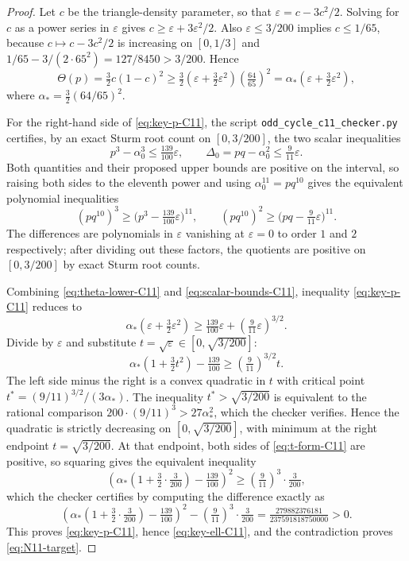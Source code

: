 \documentclass[11pt]{article}
\newcommand{\eps}{\varepsilon}
\begin{document}
\begin{proof}
Let $c$ be the triangle-density parameter, so that $\eps=c-3c^2/2$.  Solving for $c$ as a power series in $\eps$ gives $c\ge\eps+3\eps^2/2$.  Also $\eps\le3/200$ implies $c\le1/65$, because $c\mapsto c-3c^2/2$ is increasing on $[0,1/3]$ and $1/65-3/(2\cdot65^2)=127/8450>3/200$.  Hence
\begin{equation}\label{eq:theta-lower-C11}
        \Theta(p)=\tfrac32 c(1-c)^2
        \ge \tfrac32\left(\eps+\tfrac32\eps^2\right)\left(\tfrac{64}{65}\right)^2
        =\alpha_*\left(\eps+\tfrac32\eps^2\right),
\end{equation}
where $\alpha_*=\tfrac32(64/65)^2$.

For the right-hand side of \eqref{eq:key-p-C11}, the script \texttt{odd\_cycle\_c11\_checker.py} certifies, by an exact Sturm root count on $[0,3/200]$, the two scalar inequalities
\begin{equation}\label{eq:scalar-bounds-C11}
        p^3-\alpha_0^3\le \tfrac{139}{100}\eps,
        \qquad
        \Delta_0=pq-\alpha_0^2\le \tfrac{9}{11}\eps.
\end{equation}
Both quantities and their proposed upper bounds are positive on the interval, so raising both sides to the eleventh power and using $\alpha_0^{11}=pq^{10}$ gives the equivalent polynomial inequalities
\[
        (pq^{10})^3\ge\bigl(p^3-\tfrac{139}{100}\eps\bigr)^{11},
        \qquad
        (pq^{10})^2\ge\bigl(pq-\tfrac{9}{11}\eps\bigr)^{11}.
\]
The differences are polynomials in $\eps$ vanishing at $\eps=0$ to order $1$ and $2$ respectively; after dividing out these factors, the quotients are positive on $[0,3/200]$ by exact Sturm root counts.

Combining \eqref{eq:theta-lower-C11} and \eqref{eq:scalar-bounds-C11}, inequality \eqref{eq:key-p-C11} reduces to
\[
        \alpha_*\left(\eps+\tfrac32\eps^2\right)
        \ge \tfrac{139}{100}\eps+\left(\tfrac{9}{11}\eps\right)^{3/2}.
\]
Divide by $\eps$ and substitute $t=\sqrt\eps\in[0,\sqrt{3/200}]$:
\begin{equation}\label{eq:t-form-C11}
        \alpha_*\left(1+\tfrac32 t^2\right)-\tfrac{139}{100}
        \ge \left(\tfrac{9}{11}\right)^{3/2}t.
\end{equation}
The left side minus the right is a convex quadratic in $t$ with critical point $t^*=(9/11)^{3/2}/(3\alpha_*)$.  The inequality $t^*>\sqrt{3/200}$ is equivalent to the rational comparison $200\cdot(9/11)^3>27\alpha_*^2$, which the checker verifies.  Hence the quadratic is strictly decreasing on $[0,\sqrt{3/200}]$, with minimum at the right endpoint $t=\sqrt{3/200}$.  At that endpoint, both sides of \eqref{eq:t-form-C11} are positive, so squaring gives the equivalent inequality
\[
        \left(\alpha_*\left(1+\tfrac32\cdot\tfrac{3}{200}\right)-\tfrac{139}{100}\right)^2
        \ge \left(\tfrac{9}{11}\right)^3\cdot\tfrac{3}{200},
\]
which the checker certifies by computing the difference exactly as
\[
        \left(\alpha_*\left(1+\tfrac32\cdot\tfrac{3}{200}\right)-\tfrac{139}{100}\right)^2
        -\left(\tfrac{9}{11}\right)^3\cdot\tfrac{3}{200}
        =\tfrac{279882376181}{237591818750000}>0.
\]
This proves \eqref{eq:key-p-C11}, hence \eqref{eq:key-ell-C11}, and the contradiction proves \eqref{eq:N11-target}.
\end{proof}
\end{document}
